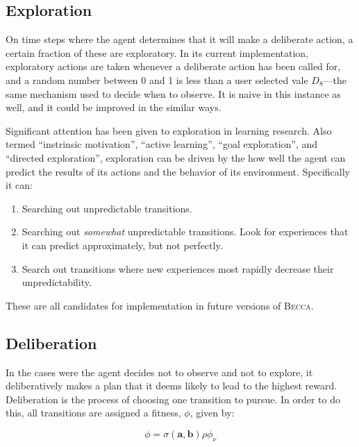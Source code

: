 \subsection{Exploration}
On time steps where the agent determines that it will make a deliberate action, a certain fraction of these are exploratory. In its current implementation, exploratory actions are taken whenever a deliberate action has been called for, and a random number between 0 and 1 is less than a user selected vale $D_8$---the same mechanism used to decide when to observe. It is naive in this instance as well, and it could be improved in the similar ways. 

Significant attention has been given to exploration in learning research. Also termed ``instrinsic motivation'', ``active learning'', ``goal exploration'', and ``directed exploration'',  exploration can be driven by the how well the agent can predict the results of its actions and the behavior of its environment. Specifically it can:

\begin{enumerate}
\item Searching out unpredictable transitions.
\item Searching out {\em somewhat} unpredictable transitions. Look for experiences that it can  predict approximately, but not perfectly.
\item Search out transitions where new experiences most rapidly decrease their unpredictability.
\end{enumerate}

These are all candidates for implementation in future versions of \textsc{Becca}.


\subsection{Deliberation}
In the cases were the agent decides not to observe and not to explore, it deliberatively makes a plan that it deems likely to lead to the highest reward. Deliberation is the process of choosing one transition to pursue. In order to do this, all transitions are assigned a fitness, $\phi$, given by:

\begin{equation}
\phi = \sigma(\mathbf{a},\mathbf{b})  \rho \phi_\nu
\end{equation}

